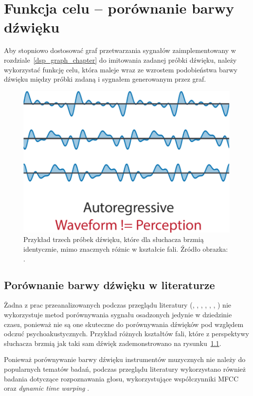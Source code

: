 \chapter{Funkcja celu -- porównanie barwy dźwięku} \label{target_function_chapter}

Aby stopniowo dostosować graf przetwarzania sygnałów zaimplementowany 
w rozdziale~\ref{dsp_graph_chapter} do imitowania zadanej próbki dźwięku,
należy wykorzystać funkcję celu, która maleje wraz ze wzrostem podobieństwa
barwy dźwięku między próbki zadaną i sygnałem generowanym przez graf. 

\begin{figure}[H]
    \centering
    \includegraphics[width=0.5\linewidth]{rys03/d_dsp_example_graph.png}
    \caption{
      Przykład trzech próbek dźwięku, które dla słuchacza brzmią identycznie, mimo
      znacznych różnic w kształcie fali. Źródło obrazka: \cite{engel2020ddsp}.
    }
    \label{fig:waveform_not_equal_to_perception}
\end{figure}

\section{Porównanie barwy dźwięku w literaturze} \label{sec:timbre_comparison_literature_overview}

Żadna z prac przeanalizowanych podczas przeglądu literatury
(\cite{engel2020ddsp}, \cite{ieee_synth_programming}, \cite{ddx7}, \cite{riffusion},
\cite{evolutionary_puredata}, \cite{parallel_evolutionary_optimization_synth_parameters}, \cite{mfcc_dtw})
nie wykorzystuje metod porównywania sygnału osadzonych jedynie w dziedzinie czasu, ponieważ
nie są one skuteczne do porównywania dźwięków pod względem odczuć psychoakustycznych.
Przykład różnych kształtów fali, które z perspektywy słuchacza brzmią jak
taki sam dźwięk zademonstrowano na rysunku~\ref{fig:waveform_not_equal_to_perception}.

Ponieważ porównywanie barwy dźwięku instrumentów muzycznych nie należy do popularnych
tematów badań, podczas przeglądu literatury wykorzystano również badania dotyczące
rozpoznawania głosu, wykorzystujące współczynniki MFCC oraz
\textit{dynamic time warping} \cite{mfcc_dtw}.

